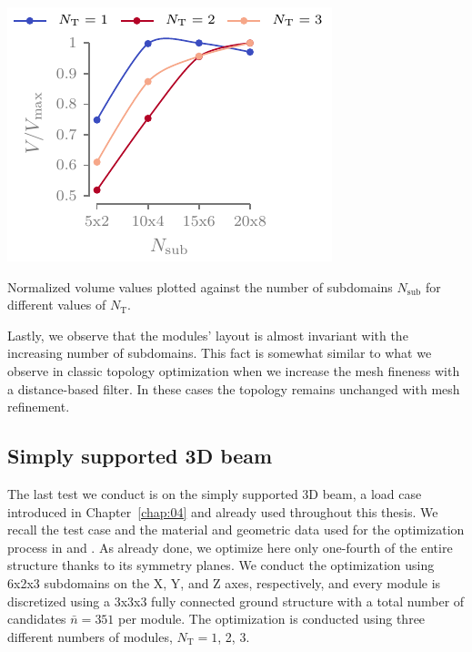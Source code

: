 \begin{marginfigure}
    \centering
    \includegraphics{figures/06_DMO/00_tug_bench_crv2/vol.pdf}
    \caption{Normalized volume values plotted against the number of subdomains $N_\text{sub}$ for different values of $N_\text{T}$.}
    \label{fig:06_cant_volume_norm_2}
\end{marginfigure}

Lastly, we observe that the modules' layout is almost invariant with the increasing number of subdomains. This fact is somewhat similar to what we observe in classic topology optimization when we increase the mesh fineness with a distance-based filter. In these cases the topology remains unchanged with mesh refinement.

\subsection{Simply supported 3D beam}
The last test we conduct is on the simply supported 3D beam, a load case introduced in Chapter~\ref{chap:04} and already used throughout this thesis. We recall the test case and the material and geometric data used for the optimization process in  and . As already done, we optimize here only one-fourth of the entire structure thanks to its symmetry planes. We conduct the optimization using 6x2x3 subdomains on the X, Y, and Z axes, respectively, and every module is discretized using a 3x3x3 fully connected ground structure with a total number of candidates $\bar{n} = 351$ per module. The optimization is conducted using three different numbers of modules, $N_\text{T}=1$, 2, 3.


